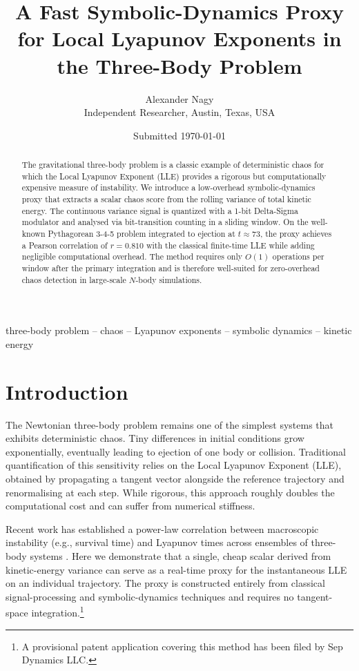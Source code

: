 \documentclass[useAMS,usenatbib,onecolumn]{mnras}
\title{A Fast Symbolic-Dynamics Proxy for Local Lyapunov Exponents in the Three-Body Problem}
\author[Alexander Nagy]{
Alexander Nagy \\
Independent Researcher, Austin, Texas, USA \\
}
\date{Submitted \today}
\begin{document}
\label{firstpage}
\pagerange{\pageref{firstpage}--\pageref{lastpage}}
\maketitle

\begin{abstract}
The gravitational three-body problem is a classic example of deterministic chaos for which the Local Lyapunov Exponent (LLE) provides a rigorous but computationally expensive measure of instability. We introduce a low-overhead symbolic-dynamics proxy that extracts a scalar chaos score from the rolling variance of total kinetic energy. The continuous variance signal is quantized with a 1-bit Delta-Sigma modulator and analysed via bit-transition counting in a sliding window. On the well-known Pythagorean 3-4-5 problem integrated to ejection at $t\approx73$, the proxy achieves a Pearson correlation of $r=0.810$ with the classical finite-time LLE while adding negligible computational overhead. The method requires only $O(1)$ operations per window after the primary integration and is therefore well-suited for zero-overhead chaos detection in large-scale $N$-body simulations.
\end{abstract}

\begin{keywords}
three-body problem -- chaos -- Lyapunov exponents -- symbolic dynamics -- kinetic energy
\end{keywords}

\section{Introduction}
\label{sec:intro}

The Newtonian three-body problem remains one of the simplest systems that exhibits deterministic chaos. Tiny differences in initial conditions grow exponentially, eventually leading to ejection of one body or collision. Traditional quantification of this sensitivity relies on the Local Lyapunov Exponent (LLE), obtained by propagating a tangent vector alongside the reference trajectory and renormalising at each step. While rigorous, this approach roughly doubles the computational cost and can suffer from numerical stiffness.

Recent work has established a power-law correlation between macroscopic instability (e.g., survival time) and Lyapunov times across ensembles of three-body systems \citep{mikkola2007}. Here we demonstrate that a single, cheap scalar derived from kinetic-energy variance can serve as a real-time proxy for the instantaneous LLE on an individual trajectory. The proxy is constructed entirely from classical signal-processing and symbolic-dynamics techniques and requires no tangent-space integration.\footnote{A provisional patent application covering this method has been filed by Sep Dynamics LLC.}
\end{document}
